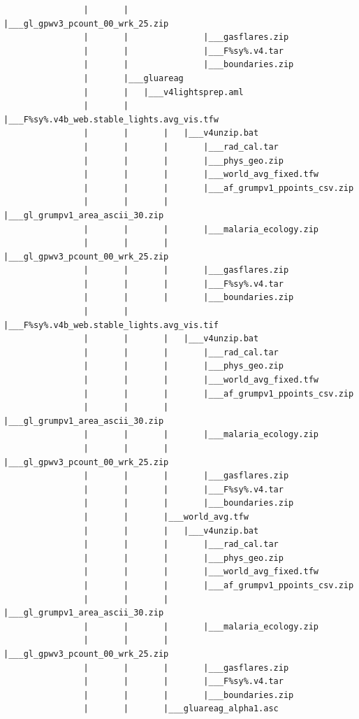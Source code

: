 \documentclass[]{book}
\begin{document}
\begin{verbatim}
                |       |               |___gl_gpwv3_pcount_00_wrk_25.zip
                |       |               |___gasflares.zip
                |       |               |___F%sy%.v4.tar
                |       |               |___boundaries.zip
                |       |___gluareag
                |       |   |___v4lightsprep.aml
                |       |       |___F%sy%.v4b_web.stable_lights.avg_vis.tfw
                |       |       |   |___v4unzip.bat
                |       |       |       |___rad_cal.tar
                |       |       |       |___phys_geo.zip
                |       |       |       |___world_avg_fixed.tfw
                |       |       |       |___af_grumpv1_ppoints_csv.zip
                |       |       |       |___gl_grumpv1_area_ascii_30.zip
                |       |       |       |___malaria_ecology.zip
                |       |       |       |___gl_gpwv3_pcount_00_wrk_25.zip
                |       |       |       |___gasflares.zip
                |       |       |       |___F%sy%.v4.tar
                |       |       |       |___boundaries.zip
                |       |       |___F%sy%.v4b_web.stable_lights.avg_vis.tif
                |       |       |   |___v4unzip.bat
                |       |       |       |___rad_cal.tar
                |       |       |       |___phys_geo.zip
                |       |       |       |___world_avg_fixed.tfw
                |       |       |       |___af_grumpv1_ppoints_csv.zip
                |       |       |       |___gl_grumpv1_area_ascii_30.zip
                |       |       |       |___malaria_ecology.zip
                |       |       |       |___gl_gpwv3_pcount_00_wrk_25.zip
                |       |       |       |___gasflares.zip
                |       |       |       |___F%sy%.v4.tar
                |       |       |       |___boundaries.zip
                |       |       |___world_avg.tfw
                |       |       |   |___v4unzip.bat
                |       |       |       |___rad_cal.tar
                |       |       |       |___phys_geo.zip
                |       |       |       |___world_avg_fixed.tfw
                |       |       |       |___af_grumpv1_ppoints_csv.zip
                |       |       |       |___gl_grumpv1_area_ascii_30.zip
                |       |       |       |___malaria_ecology.zip
                |       |       |       |___gl_gpwv3_pcount_00_wrk_25.zip
                |       |       |       |___gasflares.zip
                |       |       |       |___F%sy%.v4.tar
                |       |       |       |___boundaries.zip
                |       |       |___gluareag_alpha1.asc

\end{verbatim}
\end{document}

